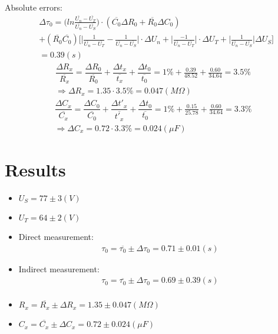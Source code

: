 \documentclass[12pt, a4paper]{article}
\newcommand{\avg}{\overline}
\newcommand{\ra}{\Rightarrow}
\newcommand{\Dt}{\Delta}
\newcommand{\hi}{\section}
\newcommand{\relerr}[1]{\dfrac{\Dt #1}{\avg{#1}}}
\begin{document}
        \par Absolute errors:
        \begin{align*}
            &\Dt \tau_{0} = \big(ln\frac{\avg{U_{n}} - \avg{U_{T}}}{\avg{U_{n}} - \avg{U_{S}}}\big)
                \cdot (\avg{C_{0}} \Dt R_{0} + \avg{R_{0}} \Dt C_{0}) \\
            &  + (\avg{R_{0}} \avg{C_{0}})
                \bigg[ \bigg| \frac{1}{\avg{U_{n}} - \avg{U_{T}}}
                            - \frac{1}{\avg{U_{n}} - \avg{U_{S}}} \bigg| \cdot \Dt U_{n}
                    + \bigg| \frac{-1}{\avg{U_{n}} - \avg{U_{T}}} \bigg| \cdot \Dt U_{T}
                    + \bigg| \frac{1}{\avg{U_{n}} - \avg{U_{S}}}  \bigg| \Dt U_{S}
                \bigg] \\
            &= 0.39 (s)
        \end{align*}
        \begin{align*}
            \relerr{R_{x}} = \relerr{R_{0}} + \relerr{t_{x}} + \relerr{t_{0}}
            = 1 \% + \frac{0.39}{48.52} + \frac{0.60}{34.64}
            = 3.5 \% \\
            \ra \Dt R_{x} = 1.35 \cdot 3.5 \% = 0.047 (M \Omega)
        \end{align*}
        \begin{align*}
            \relerr{C_{x}} = \relerr{C_{0}} + \relerr{t'_{x}} + \relerr{t_{0}}
            = 1 \% + \frac{0.15}{25.78} + \frac{0.60}{34.64}
            = 3.3 \% \\
            \ra \Dt C_{x} = 0.72 \cdot 3.3 \% = 0.024 (\mu F)
        \end{align*}

\hi{Results}
\begin{tcolorbox}
    \begin{itemize}
        \item $U_{S} = 77 \pm 3 (V)$
        \item $U_{T} = 64 \pm 2 (V)$
        \item Direct measurement: \\
            \begin{align*}
                \tau_{0} = \avg{\tau_{0}} \pm \Dt \tau_{0} = 0.71 \pm 0.01 (s)
            \end{align*}
        \item Indirect measurement:
            \begin{align*}
                \tau_{0} = \avg{\tau_{0}} \pm \Dt \tau_{0} = 0.69 \pm 0.39 (s) \\
            \end{align*}
    \end{itemize}
\end{tcolorbox}
\begin{tcolorbox}
    \begin{itemize}
        \item $R_{x} = \avg{R_x} \pm \Dt R_{x} = 1.35 \pm 0.047 (M\Omega)$
        \item $C_{x} = \avg{C_x} \pm \Dt C_{x} = 0.72 \pm 0.024 (\mu F)$
    \end{itemize}
\end{tcolorbox}
\end{document}
